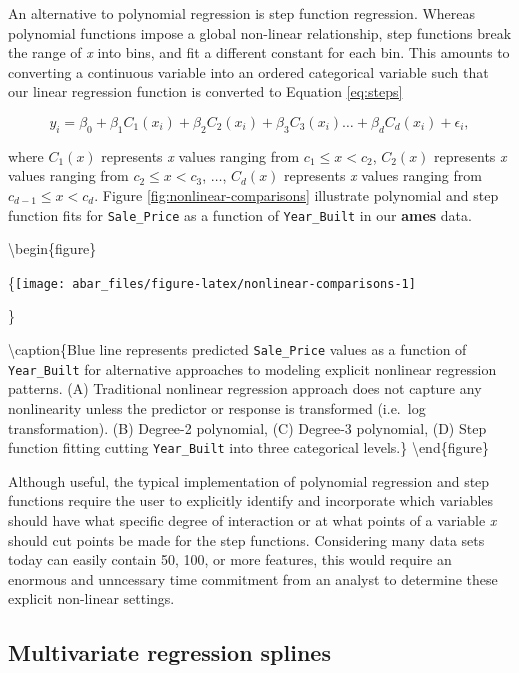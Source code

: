 \documentclass[]{book}
\theoremstyle{definition}
\theoremstyle{definition}
\theoremstyle{definition}
\theoremstyle{remark}
\begin{document}
An alternative to polynomial regression is step function regression.
Whereas polynomial functions impose a global non-linear relationship,
step functions break the range of \emph{x} into bins, and fit a
different constant for each bin. This amounts to converting a continuous
variable into an ordered categorical variable such that our linear
regression function is converted to Equation \eqref{eq:steps}

\begin{equation}
\label{eq:steps}
  y_i = \beta_0 + \beta_1 C_1(x_i) + \beta_2 C_2(x_i) + \beta_3 C_3(x_i) \dots + \beta_d C_d(x_i) + \epsilon_i,
\end{equation}

where \(C_1(x)\) represents \emph{x} values ranging from
\(c_1 \leq x < c_2\), \(C_2(x)\) represents \emph{x} values ranging from
\(c_2 \leq x < c_3\), \(\dots\), \(C_d(x)\) represents \emph{x} values
ranging from \(c_{d-1} \leq x < c_d\). Figure
\ref{fig:nonlinear-comparisons} illustrate polynomial and step function
fits for \texttt{Sale\_Price} as a function of \texttt{Year\_Built} in
our \textbf{ames} data.

\textbackslash{}begin\{figure\}

\{\centering \texttt{[image: abar\_files/figure-latex/nonlinear-comparisons-1]}

\}

\textbackslash{}caption\{Blue line represents predicted
\texttt{Sale\_Price} values as a function of \texttt{Year\_Built} for
alternative approaches to modeling explicit nonlinear regression
patterns. (A) Traditional nonlinear regression approach does not capture
any nonlinearity unless the predictor or response is transformed
(i.e.~log transformation). (B) Degree-2 polynomial, (C) Degree-3
polynomial, (D) Step function fitting cutting \texttt{Year\_Built} into
three categorical levels.\}\label{fig:nonlinear-comparisons}
\textbackslash{}end\{figure\}

Although useful, the typical implementation of polynomial regression and
step functions require the user to explicitly identify and incorporate
which variables should have what specific degree of interaction or at
what points of a variable \emph{x} should cut points be made for the
step functions. Considering many data sets today can easily contain 50,
100, or more features, this would require an enormous and unncessary
time commitment from an analyst to determine these explicit non-linear
settings.

\hypertarget{multivariate-regression-splines}{%
\subsection{Multivariate regression
splines}\label{multivariate-regression-splines}}
\end{document}
